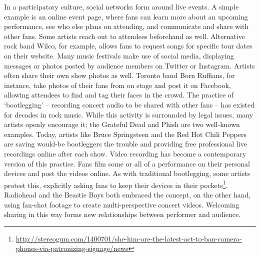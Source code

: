 In a participatory culture, social networks form around live events. A simple example is an online event page, where fans can learn more about an upcoming performance, see who else plans on attending, and communicate and share with other fans. Some artists reach out to attendees beforehand as well. Alternative rock band Wilco, for example, allows fans to request songs for specific tour dates on their website. Many music festivals make use of social media, displaying messages or photos posted by audience members on Twitter or Instagram. Artists often share their own show photos as well. Toronto band Born Ruffians, for instance, take photos of their fans from on stage and post it on Facebook, allowing attendees to find and tag their faces in the crowd. The practice of `bootlegging' -- recording concert audio to be shared with other fans -- has existed for decades in rock music. While this activity is surrounded by legal issues, many artists openly encourage it; the Grateful Dead and Phish are two well-known examples. Today, artists like Bruce Springsteen and the Red Hot Chili Peppers are saving would-be bootleggers the trouble and providing free professional live recordings online after each show. Video recording has become a contemporary version of this practice. Fans film some or all of a performance on their personal devices and post the videos online. As with traditional bootlegging, some artists protest this, explicitly asking fans to keep their devices in their pockets\footnote{\url{http://stereogum.com/1400701/she-him-are-the-latest-act-to-ban-camera-phones-via-patronizing-signage/news}}. Radiohead and the Beastie Boys both embraced the concept, on the other hand, using fan-shot footage to create multi-perspective concert videos. Welcoming sharing in this way forms new relationships between performer and audience.
